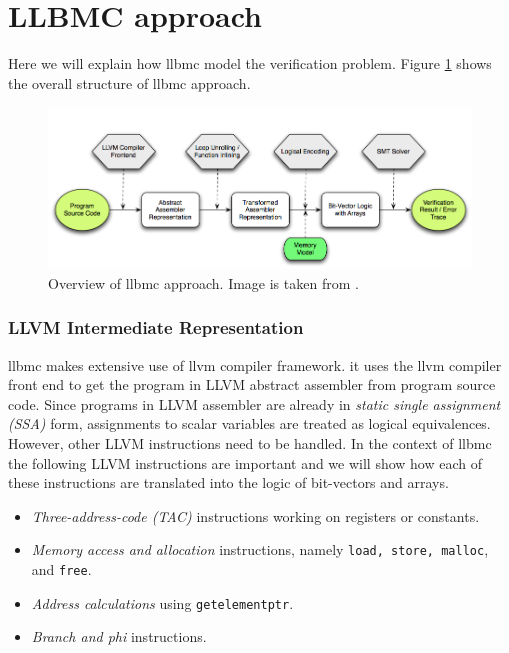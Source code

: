 \documentclass[14pt]{article}
\begin{document}
\section{LLBMC approach}\label{lbmc approach}
Here we will explain how llbmc model the verification problem.  Figure \ref{fig:llbmc_overview} shows the overall structure of llbmc approach.  
\begin{figure}[htb!]
  \begin{centering}
    \includegraphics[scale=0.5]{figures/llbmc_overview}\par
  \end{centering}
  \caption{ Overview of llbmc approach. Image is taken from \cite{llbmc2}.}
  \label{fig:llbmc_overview}
\end{figure}



\subsubsection{LLVM Intermediate Representation}
llbmc makes extensive use of llvm compiler framework. it uses the llvm compiler front end to get the program in LLVM abstract assembler from program source code. Since programs in LLVM assembler are already in \textit{static single assignment (SSA)} form, assignments to scalar variables are treated as logical equivalences. However, other LLVM instructions need to be handled. 
In the context of llbmc the following LLVM instructions are important and we will show how each of these instructions are translated into the logic of bit-vectors and arrays. 
\begin{itemize}
  \item \textit{Three-address-code (TAC)} instructions working on registers or constants.
  \item \textit{Memory access and allocation} instructions, namely \texttt{load, store, malloc}, and \texttt{free}.
  \item \textit{Address calculations} using \texttt{getelementptr}.
  \item \textit{Branch and phi} instructions.
\end{itemize}
\end{document}
